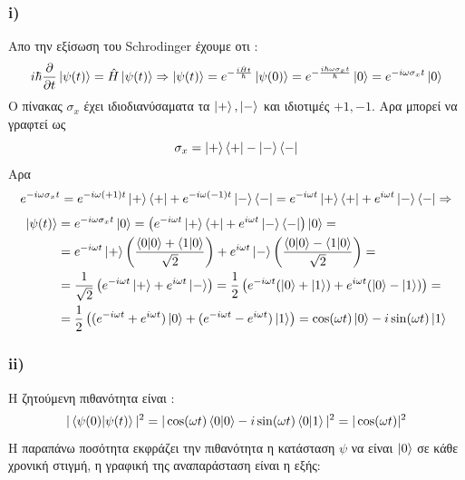 \documentclass[12pt]{article}
\begin{document}
\section*{{}}
\subsubsection*{\textlatin{\bf i)}}
Απο την εξίσωση του \textlatin{Schrodinger} έχουμε οτι :
$$i\hbar\frac{\partial}{\partial t}\ket{\psi(t)} = \hat{H}\ket{\psi(t)} \Rightarrow  \ket{\psi(t)} = e^{-\frac{i\hat{H}t}{\hbar}}\ket{\psi(0)} = e^{-\frac{i\hbar\omega \sigma_x t}{\hbar}}\ket{0} = e^{-i\omega \sigma_x t}\ket{0}
$$
O πίνακας $\sigma_x$ έχει ιδιοδιανύσαματα τα $\ket{+},\ket{-}$ και ιδιοτιμές $+1,-1$. Αρα μπορεί να γραφτεί ως 
$$ \sigma_x = \ket{+}\bra{+} - \ket{-}\bra{-}$$
Αρα
$$e^{-i\omega \sigma_x t} = e^{-i\omega (+1) t}\ket{+}\bra{+}+ e^{-i\omega (-1) t}\ket{-}\bra{-} = e^{-i\omega t}\ket{+}\bra{+}+ e^{i\omega t}\ket{-}\bra{-}\Rightarrow$$
\begin{align*}
    \ket{\psi(t)} &= e^{-i\omega \sigma_x t}\ket{0} = \left(e^{-i\omega t}\ket{+}\bra{+}+ e^{i\omega t}\ket{-}\bra{-}\right)\ket{0}=\\
    &=e^{-i\omega t}\ket{+}\left(\frac{\braket{0|0}+\braket{1|0}}{\sqrt{2}}\right) + e^{i\omega t}\ket{-}\left(\frac{\braket{0|0}-\braket{1|0}}{\sqrt{2}}\right)=\\
    &=\frac{1}{\sqrt{2}}\left(e^{-i\omega t}\ket{+}+e^{i\omega t}\ket{-}\right) = \frac{1}{{2}}\left(e^{-i\omega t}(\ket{0}+ \ket{1})+e^{i\omega t}(\ket{0}- \ket{1})\right)=\\
    &=\frac{1}{{2}}\left((e^{-i\omega t}+ e^{i\omega t})\ket{0}+(e^{-i\omega t}- e^{i\omega t})\ket{1}\right)=\cos(\omega t)\ket{0} -i\sin(\omega t)\ket{1}
\end{align*}
\subsubsection*{\textlatin{\bf ii)}}
Η ζητούμενη πιθανότητα είναι :
$$|\braket{\psi(0)|\psi(t)}|^2 = |\cos(\omega t)\braket{0|0} -i\sin(\omega t)\braket{0|1}|^2 = |\cos(\omega t)|^2$$
Η παραπάνω ποσότητα εκφράζει την πιθανότητα η κατάσταση $\psi$ να είναι $\ket{0}$  σε κάθε χρονική στιγμή, η γραφική της αναπαράσταση είναι η εξής: 
\end{document}
